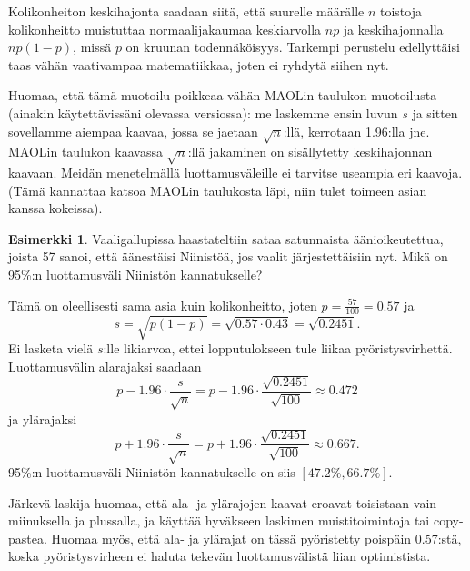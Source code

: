 \documentclass[12pt,leqno,a4paper,oneside]{amsart}
\theoremstyle{definition}
\newtheorem{example}[proclaim]{Esimerkki}
\theoremstyle{remark}
\numberwithin{equation}{section}
\begin{document}

Kolikonheiton keskihajonta saadaan siitä, että suurelle määrälle $n$ toistoja kolikonheitto muistuttaa normaalijakaumaa keskiarvolla $np$ ja 
keskihajonnalla $np(1-p)$, missä $p$ on kruunan todennäköisyys. Tarkempi perustelu edellyttäisi taas vähän vaativampaa matematiikkaa,
joten ei ryhdytä siihen nyt.

Huomaa, että tämä muotoilu poikkeaa vähän MAOLin taulukon muotoilusta (ainakin käytettävissäni olevassa versiossa): me laskemme ensin
luvun $s$ ja sitten sovellamme aiempaa kaavaa, jossa se jaetaan $\sqrt{n}$:llä, kerrotaan 1.96:lla jne. MAOLin taulukon kaavassa $\sqrt{n}$:llä
jakaminen on sisällytetty keskihajonnan kaavaan. Meidän menetelmällä luottamusväleille ei tarvitse useampia eri kaavoja. (Tämä kannattaa katsoa
MAOLin taulukosta läpi, niin tulet toimeen asian kanssa kokeissa).


\begin{example}
\label{luottamusvaliesimerkki}
Vaaligallupissa haastateltiin sataa satunnaista ääni\-oikeutettua, joista 57 sanoi,
että äänestäisi Niinistöä, jos vaalit jär\-jes\-tet\-täi\-siin nyt. Mikä on 95\%:n luottamusväli Niinistön kannatukselle?

Tämä on oleellisesti sama asia kuin kolikonheitto, joten $p=\frac{57}{100} = 0.57$ ja
$$s = \sqrt{p(1-p)} = \sqrt{0.57\cdot 0.43} = \sqrt{0.2451} .$$
Ei lasketa vielä $s$:lle likiarvoa, ettei lopputulokseen tule liikaa pyöristys\-virhettä.
Luottamusvälin alarajaksi saadaan
$$p-1.96\cdot\frac{s}{\sqrt{n}} = p - 1.96\cdot\frac{\sqrt{0.2451}}{\sqrt{100}} \approx 0.472$$
ja ylärajaksi 
$$p + 1.96\cdot\frac{s}{\sqrt{n}} = p + 1.96\cdot\frac{\sqrt{0.2451}}{\sqrt{100}} \approx 0.667.$$
95\%:n luottamusväli Niinistön kannatukselle on siis $[47.2\% ,66.7\%].$

Järkevä laskija huomaa, että ala- ja ylärajojen kaavat eroavat toisistaan vain mii\-nuk\-sel\-la ja plussalla, ja käyttää hyväkseen laskimen
muisti\-toimintoja tai copy-pastea. Huomaa myös, että ala- ja ylärajat on tässä pyöristetty poispäin 0.57:stä, koska pyöristysvirheen ei haluta 
tekevän luottamus\-välistä liian optimistista.
\end{example}
\end{document}
